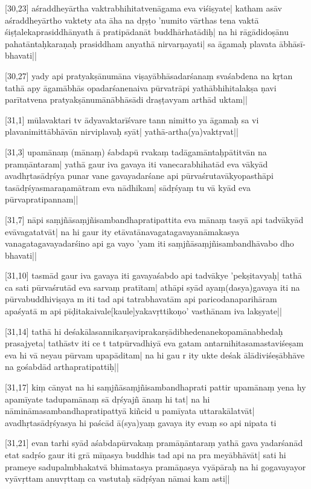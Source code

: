 [30,23] aśraddheyārtha%
vaktrabhihitatvenāgama eva viśiṣyate| katham asāv aśraddheyārtho vaktety ata āha na dṛṣṭo %
'numito vārthas tena vaktā śiṣṭalekaprasiddhānyath%
ā pratipādanāt buddhārhatādiḥ| na hi %
rāgādidoṣānu%
pahatāntaḥkaraṇaḥ prasiddham anyathā nirvarṇayati| sa āgamaḥ plavata ābhāsī-bhavati||

[30,27] yady api pratyakṣānumāna%
viṣayābhāsadarśanaṃ svaśabdena na kṛtan tathā apy āgamābhās%
opadarśanenaiva pūrvatrāpi yathābhihitalakṣa%
ṇavi%
parītatvena pratyakṣānumānābhāsādi draṣṭavyam arthād uktam||

[31,1] mūlavaktari tv ādyavaktarīśvare tann nimitto ya āgamaḥ sa vi%
plavanimittābhāvān nirviplavaḥ syāt| yathā-artha(ya)vaktṛvat||

[31,3] upamānaṃ (mānaṃ) %
śabdapū%
rvakaṃ tadāgamāntaḥpātitvān na
pramṇāntaram| yathā gaur iva gavaya iti vanecarabhihatād eva vākyād avadhṛtasādṛśya punar vane gavayadarśane api
pūrvaśrutavākyopasthāpi%
tasādṛśyasmaraṇamātram eva nādhikam| sādṛśyaṃ tu vā%
kyād eva pūrvapratipannam||

[31,7] nāpi saṃjñāsaṃjñisambandhapratipattita eva mānaṃ tasyā api tadvākyād evāvagatatvāt| na hi gaur ity etāvatānavagatagavayanāmakasya vanagatagavayadarśino api ga%
vayo 'yam iti saṃjñāsaṃjñisambandhāvabo%
dho bhavati||

[31,10] tasmād gaur iva gavaya iti gavayaśabdo api tadvākye 'pekṣitavyaḥ| tathā ca sati pūrvaśrutād eva sarvaṃ pratītam| athāpi syād ayaṃ(dasya)gavaya iti na pūrvabuddhiviṣaya%
m iti tad api tatrabhavatām api paricodanaparihāram apaśyatā%
m api
pīḍitakaivale[kaule]yakavṛttikoṇo'%
vasthānam iva%
lakṣyate||

[31,14] tathā hi deśakālasannikarṣaviprakarṣādibhedenanekopamānabhedaḥ prasajyeta| tathāstv iti ce%
t tatpūrvadhiyā eva gatam antarnihitasamastaviśeṣam eva%
hi vā neyau pūrvam upapāditam| na hi gau%
r ity ukte deśak%
ālādiviśeṣābhāve na gośabdād arthapratipattiḥ||

[31,17] kiṃ cānyat na hi saṃjñāsaṃjñisambandhaprati%
pattir upamānaṃ yena hy apamīyate tadupamānaṃ sā%
dṛśyajñ%
ānaṃ hi tat| na hi nāmināmasambandhapratipattyā kiñcid u%
pamīyata uttarakālatvāt| avadhṛtasādṛśyasya hi paścād ā(sya)yaṃ gavaya ity evaṃ so api nipata%
ti

[31,21] evan tarhi syād aśabdapūrvakaṃ pramāṇāntaraṃ yathā gava%
yadarśanād%
etat sadṛśo gaur iti grā%
mīṇasya buddhis tad api na
pra%
meyābhāvāt| sati hi prameye sadupalmbhakatvā%
bhimatasya pramāṇasya vyāpāraḥ na hi gogavayayor vyāvṛttam anuvṛttaṃ ca%
vastutaḥ sādṛśyan nāmai%
kam asti||

